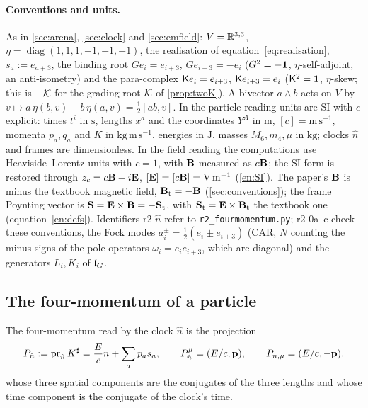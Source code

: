 \paragraph{Conventions and units.} As in \cref{sec:arena}, \cref{sec:clock} and \cref{sec:emfield}: $V=\mathbb{R}^{3,3}$, $\eta=\operatorname{diag}(1,1,1,\allowbreak-1,-1,-1)$, the
realisation of equation~\cref{eq:realisation}, $s_a:=e_{a+3}$, the binding root $Ge_i=e_{i+3}$, $Ge_{i+3}=-e_i$ ($G^2=-\mathbf 1$, $\eta$-self-adjoint, an
anti-isometry) and the para-complex $\mathsf K e_i=e_{i+3}$, $\mathsf K e_{i+3}=e_i$ ($\mathsf K^2=\mathbf 1$, $\eta$-skew; this is $-\mathcal K$ for the grading root $\mathcal K$ of
\cref{prop:twoK}). A bivector $a\wedge b$ acts on $V$ by
$v\mapsto a\,\eta(b,v)-b\,\eta(a,v)=\tfrac12[ab,v]$. In the particle reading units are SI with $c$ explicit: times $t^i$ in $\mathrm s$, lengths $x^a$
and the coordinates $Y^A$ in $\mathrm m$, $[c]=\mathrm{m\,s^{-1}}$, momenta $p_a,q_a$ and $K$ in $\mathrm{kg\,m\,s^{-1}}$, energies in $\mathrm J$,
masses $M_6,m_4,\mu$ in $\mathrm{kg}$; clocks $\hat n$ and frames are dimensionless. In the field reading the computations use Heaviside--Lorentz units with
$c=1$, with $\mathbf B$ measured as $c\mathbf B$; the SI form is restored through $z_c=c\mathbf B+i\mathbf E$, $[\mathbf E]=[c\mathbf B]=\mathrm{V\,m^{-1}}$ (\cref{en:SI}).
The paper's $\mathbf B$ is minus the textbook magnetic field, $\mathbf B_{\rm t}=-\mathbf B$ (\cref{sec:conventions}); the frame Poynting vector is $\mathbf S=\mathbf E\times\mathbf B
=-\mathbf S_{\rm t}$, with $\mathbf S_{\rm t}=\mathbf E\times\mathbf B_{\rm t}$ the textbook one (equation~\cref{en:defs}). Identifiers r2-$\hat n$ refer to
\texttt{r2\_fourmomentum.py}; r2-0a--c check these conventions, the Fock modes $a^\pm_i=\tfrac12(e_i\pm e_{i+3})$ (CAR, $N$ counting the minus
signs of the pole operators $\omega_i=e_ie_{i+3}$, which are diagonal) and the generators $L_i,K_i$ of $\mathfrak l_G$.

\subsection{The four-momentum of a particle}
\label{r2:sec:particle}

The four-momentum read by the clock $\hat n$ is the projection
\begin{equation}
\label{r2:eq:P}
P_{\hat n}:=\operatorname{pr}_{\hat n}K^\sharp=\frac Ecn+\sum_ap_as_a,\qquad P_{\hat n}^\mu=(E/c,\mathbf p),\qquad P_{n,\mu}=(E/c,-\mathbf p),
\end{equation}
whose three spatial components are the conjugates of the three lengths and whose time component is the conjugate of the clock's time.

